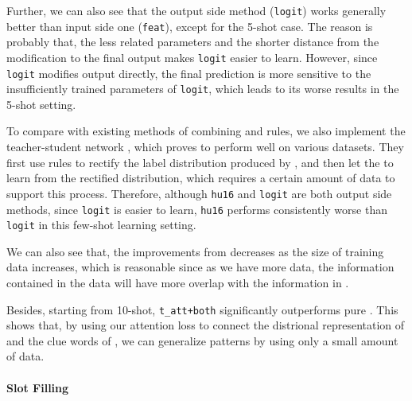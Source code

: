 Further, we can also see that the output side method (\texttt{logit}) works generally better than input side one (\texttt{feat}), except for the 5-shot case.
The reason is probably that, the less \RE related parameters and the shorter distance from the modification to the final output makes \texttt{logit} easier to learn.
However, since \texttt{logit} modifies output directly, the final prediction is more sensitive to the insufficiently trained parameters of \texttt{logit}, which leads to its worse results in the 5-shot setting.

To compare with existing methods of combining \NN and rules, we also implement the teacher-student network \cite{liu2016attention}, which proves to perform well on various datasets.
They first use \FOL rules to rectify the label distribution produced by \NN, and then let the \NN to learn from the rectified distribution, which requires a certain amount of data to support this process.
Therefore, although \texttt{hu16} and \texttt{logit} are both output side methods, since \texttt{logit} is easier to learn,
\texttt{hu16} performs consistently worse than \texttt{logit} in this few-shot learning setting.

We can also see that, the improvements from \RE decreases as the size of training data increases,
which is reasonable since as we have more data, the information contained in the data will have more overlap with the information in \RE.

Besides, starting from 10-shot, \texttt{t\_att+both} significantly outperforms pure \RE.
This shows that, by using our attention loss to connect the distrional representation of \NN and the clue words of \RE, we can generalize \RE patterns by using only a small amount of data.


\paragraph{Slot Filling}

